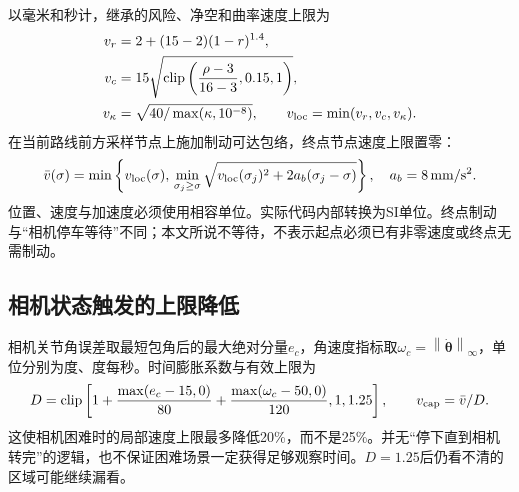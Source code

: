 \documentclass[UTF8,a4paper,zihao=5,fontset=windows]{ctexart}
\newcommand{\vect}[1]{\bm{#1}}
\newcommand{\norm}[1]{\left\lVert#1\right\rVert}
\newcommand{\clip}{\operatorname{clip}}
\newcommand{\unit}[1]{\,\mathrm{#1}}
\begin{document}
以毫米和秒计，继承的风险、净空和曲率速度上限为
\begin{align}
v_r&=2+(15-2)(1-r)^{1.4},\\
v_c&=15\sqrt{\clip\left(\frac{\rho-3}{16-3},0.15,1\right)},\\
v_\kappa&=\sqrt{40/\max(\kappa,10^{-8})},\qquad v_{\rm loc}=\min(v_r,v_c,v_\kappa).
\label{eq:speed_limits}
\end{align}
在当前路线前方采样节点上施加制动可达包络，终点节点速度上限置零：
\begin{equation}
\bar v(\sigma)=\min\left\{v_{\rm loc}(\sigma),\,
\min_{\sigma_j\ge\sigma}\sqrt{v_{\rm loc}(\sigma_j)^2+2a_b(\sigma_j-\sigma)}\right\},\quad a_b=8\unit{mm/s^2}.
\label{eq:braking_envelope}
\end{equation}
位置、速度与加速度必须使用相容单位。实际代码内部转换为SI单位。终点制动与“相机停车等待”不同；本文所说不等待，不表示起点必须已有非零速度或终点无需制动。

\subsection{相机状态触发的上限降低}
相机关节角误差取最短包角后的最大绝对分量$e_c$，角速度指标取$\omega_c=\norm{\dot{\vect\theta}}_\infty$，单位分别为度、度每秒。时间膨胀系数与有效上限为
\begin{equation}
D=\clip\left[1+\frac{\max(e_c-15,0)}{80}+\frac{\max(\omega_c-50,0)}{120},1,1.25\right],\qquad v_{\rm cap}=\bar v/D.
\label{eq:dilation}
\end{equation}
这使相机困难时的局部速度上限最多降低20\%，而不是25\%。并无“停下直到相机转完”的逻辑，也不保证困难场景一定获得足够观察时间。$D=1.25$后仍看不清的区域可能继续漏看。
\end{document}
